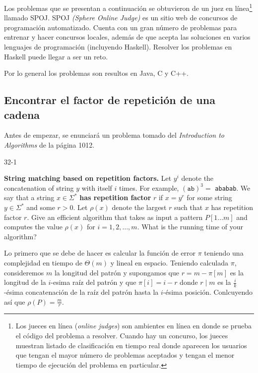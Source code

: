 Los problemas que se presentan a continuación se obtuvieron de un juez en línea\footnote{
    Los jueces en línea (\textit{online judges}) son ambientes en línea en donde se prueba el
    código del problema a resolver. Cuando hay un concurso, los jueces muestran listado de
    clasificación en tiempo real donde aparecen los usuarios que tengan el mayor número de
    problemas aceptados y tengan el menor tiempo de ejecución del problema en particular.
} llamado {\selectfont SPOJ}.
{\selectfont SPOJ} \textit{(Sphere Online Judge)} es un sitio web de concursos
de programación automatizado. Cuenta con un gran número de problemas para entrenar y hacer
concursos locales, además de que acepta las soluciones en varios lenguajes de programación
(incluyendo Haskell). Resolver los problemas en Haskell puede llegar a ser un reto.

Por lo general los problemas son resultos en Java, C y C++.

\subsection{Encontrar el factor de repetición de una cadena}
Antes de empezar, se enunciará un problema tomado del
\emph{Introduction to Algorithms}\cite{cormen_2009} de la página 1012.

\begin{tcolorbox}
\hypertarget{repetitions-facor}{32-1}   
\textbf{String matching based on repetition factors.}
Let $y^i$ denote the concatenation of string $y$ with itself $i$ times. For example,
$(\texttt{ab})^3 =$ \texttt{ababab}. We say that a string $x \in \Sigma^*$
\textbf{has repetition factor} $r$ if $x = y^r$ for some string $y \in \Sigma^*$ and some $r > 0$.
Let $\rho(x)$ denote the largest $r$ such that $x$ has repetition factor $r$.
Give an efficient algorithm that takes as input a pattern $P[1 \ldots m]$ and computes the value
$\rho(x)$ for $i = 1,2,\ldots,m$. What is the running time of your algorithm?
\end{tcolorbox}
    
Lo primero que se debe de hacer es calcular la función de error $\pi$ teniendo una complejidad en
tiempo de $\Theta(m)$ y lineal en espacio. Teniendo calculada $\pi$, consideremos $m$ la longitud
del patrón y supongamos que $r = m - \pi[m]$ es la longitud de la $i$-esima raíz del patrón y que
$\pi[i] = i - r$ donde $r \mid m$ es la $\frac{i}{k}$-ésima concatenación de la raíz del patrón
hasta la $i$-ésima posición. Conlcuyendo así que $\rho(P) = \frac{m}{r}$.

